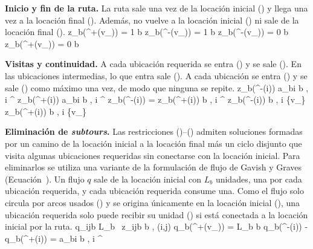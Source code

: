 {\bf Inicio y fin de la ruta.}
La ruta sale una vez de la locación inicial () y llega una vez a la locación final (). Además, no vuelve a la locación inicial
() ni sale de la locación final ().
\startplaceformula
\startformula
	\startalign[n=3, align={right,left,left}]
		\NC \NC z_b(\delta^{+}(v_{})) = 1 \NC \qquad \forall b \in {} 
		\NC \NC z_b(\delta^{-}(v_{})) = 1 \NC \qquad \forall b \in {} 
		\NC \NC z_b(\delta^{-}(v_{})) = 0 \NC \qquad \forall b \in {} 
		\NC \NC z_b(\delta^{+}(v_{})) = 0 \NC \qquad \forall b \in {} 
	\stopalign
\stopformula
\stopplaceformula

{\bf Visitas y continuidad.}
A cada ubicación requerida se entra () y se sale
(). En las ubicaciones intermedias, lo que entra sale
(). A cada ubicación se entra () y
se sale () como máximo una vez, de modo que ninguna se
repite.
\startplaceformula
\startformula
	\startalign[n=3, align={right,left,left}]
		\NC \NC z_b(\delta^{-}(i)) \geq a_{bi} \NC \qquad \forall b \in {},\; i \in {}^{} 
		\NC \NC z_b(\delta^{+}(i)) \geq a_{bi} \NC \qquad \forall b \in {},\; i \in {}^{} 
		\NC \NC z_b(\delta^{-}(i)) = z_b(\delta^{+}(i)) \NC \qquad \forall b \in {},\; i \in {}^{} 
		\NC \NC z_b(\delta^{-}(i))  \NC \qquad \forall b \in {},\; i \in {} \setminus \{v_{}\} 
		\NC \NC z_b(\delta^{+}(i))  \NC \qquad \forall b \in {},\; i \in {} \setminus \{v_{}\} 
	\stopalign
\stopformula
\stopplaceformula

{\bf Eliminación de {\em subtours}.}
Las restricciones ()--()
admiten soluciones formadas por un camino de la locación inicial a la locación final más un
ciclo disjunto que visita algunas ubicaciones requeridas sin conectarse con la
locación inicial. Para eliminarlos se utiliza una variante de la formulación de flujo
de Gavish y Graves (Ecuación~\in[eq:gg]). Un flujo $q$ sale de la locación inicial con
$L_b$ unidades, una por cada ubicación requerida, y cada ubicación requerida
consume una. Como el flujo solo circula por arcos usados
() y se origina únicamente en la locación inicial
(), una ubicación requerida solo puede recibir su
unidad () si está conectada a la locación inicial por la ruta.
\startplaceformula
\startformula
	\startalign[n=3, align={right,left,left}]
		\NC \NC q_{ijb} \leq L_b \, z_{ijb} \NC \qquad \forall b \in {},\; (i,j) \in {} 
		\NC \NC q_b(\delta^{+}(v_{})) = L_b \NC \qquad \forall b \in {} 
		\NC \NC q_b(\delta^{-}(i)) - q_b(\delta^{+}(i)) = a_{bi} \NC \qquad \forall b \in {},\; i \in {}^{} 
	\stopalign
\stopformula
\stopplaceformula

